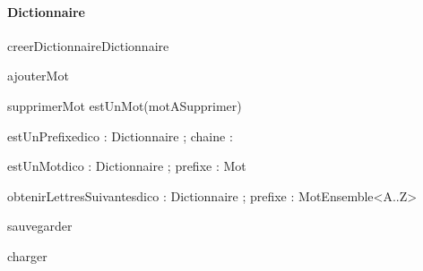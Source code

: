 \paragraph{Dictionnaire}
\begin{algorithme}

  \signaturefonction
  {creerDictionnaire}{}{Dictionnaire}

  \signatureProcedure
  {ajouterMot}{ }

  \signatureProcedureAvecPreconditions
  {supprimerMot}{ }{estUnMot(motASupprimer)}
  
  \signaturefonction
  {estUnPrefixe}{dico : Dictionnaire ; chaine : \chaine}{\booleen}

  \signaturefonction
  {estUnMot}{dico : Dictionnaire ; prefixe : Mot}{\booleen}

  \signaturefonction
  {obtenirLettresSuivantes}{dico : Dictionnaire ; prefixe : Mot}{Ensemble<A..Z>}

  \signatureProcedure
  {sauvegarder}{}

  \signatureProcedure
  {charger}{ }

\end{algorithme}
